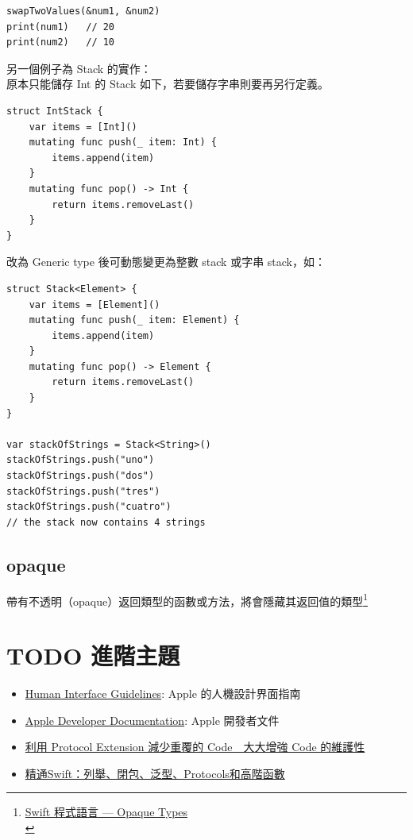 \documentclass[a4paper,12pt]{article}
\begin{document}
\begin{enumerate}
\begin{lstlisting}
swapTwoValues(&num1, &num2)
print(num1)   // 20
print(num2)   // 10
\end{lstlisting}
另一個例子為 Stack 的實作：\\
原本只能儲存 Int 的 Stack 如下，若要儲存字串則要再另行定義。\\
\lstset{breaklines=true,language=swift,label= ,caption= ,captionpos=b,firstnumber=1,numbers=left}
\begin{lstlisting}
struct IntStack {
    var items = [Int]()
    mutating func push(_ item: Int) {
        items.append(item)
    }
    mutating func pop() -> Int {
        return items.removeLast()
    }
}
\end{lstlisting}
改為 Generic type 後可動態變更為整數 stack 或字串 stack，如：\\
\lstset{breaklines=true,language=swift,label= ,caption= ,captionpos=b,firstnumber=1,numbers=left}
\begin{lstlisting}
struct Stack<Element> {
    var items = [Element]()
    mutating func push(_ item: Element) {
        items.append(item)
    }
    mutating func pop() -> Element {
        return items.removeLast()
    }
}

var stackOfStrings = Stack<String>()
stackOfStrings.push("uno")
stackOfStrings.push("dos")
stackOfStrings.push("tres")
stackOfStrings.push("cuatro")
// the stack now contains 4 strings

\end{lstlisting}
\end{enumerate}
\subsection{opaque}
\label{sec:org0150ff9}
帶有不透明（opaque）返回類型的函數或方法，將會隱藏其返回值的類型\footnote{\href{https://medium.com/jeremy-xue-s-blog/swift-\%E7\%A8\%8B\%E5\%BC\%8F\%E8\%AA\%9E\%E8\%A8\%80-opaque-types-600ad5758b91}{Swift 程式語言 — Opaque Types}\\}\\
\newpage

\section{{\bfseries\sffamily TODO} 進階主題}
\label{advanced}
\begin{itemize}
\item \href{https://developer.apple.com/design/human-interface-guidelines/}{Human Interface Guidelines}: Apple 的人機設計界面指南\\
\item \href{https://developer.apple.com/documentation}{Apple Developer Documentation}: Apple 開發者文件\\
\item \href{https://www.appcoda.com.tw/protocol-extension/}{利用 Protocol Extension 減少重覆的 Code　大大增強 Code 的維護性}\\
\item \href{https://appcoda.com.tw/mastering-swift/}{精通Swift：列舉、閉包、泛型、Protocols和高階函數}\\
\end{itemize}
\newpage
\end{document}
